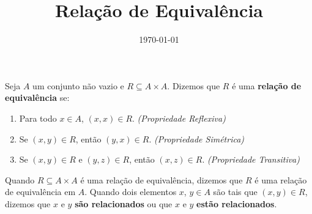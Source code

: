 \documentclass{beamer}
\title{Rela\c{c}\~ao de Equival\^encia}
\author[\autor]{\autor}
\institute[\instituto]{\instituto}
\date{\today}
\begin{document}
    \begin{frame}
        \maketitle
    \end{frame}


    \begin{frame}
        \begin{definicao}
            Seja $A$ um conjunto n{\~a}o vazio e $R\subseteq A \times A$. Dizemos que $R$ {\'e} uma \textbf{rela{\c c}{\~a}o de equival{\^e}ncia} se:
            \begin{enumerate}[label={\roman*})]
                \item Para todo $x \in A$, $(x,x) \in R$. \textit{(Propriedade Reflexiva)}
                \item Se $(x, y) \in R$, ent\~ao $(y, x) \in R$. \textit{(Propriedade Sim\'etrica)}
                \item Se $(x, y) \in R$ e $(y, z) \in R$, ent\~ao $(x, z)\in R$. \textit{(Propriedade Transitiva)}
            \end{enumerate}
        \end{definicao}

        Quando $R\subseteq A \times A$ {\'e} uma rela{\c c}{\~a}o de equival{\^e}ncia, dizemos que $R$ {\'e} uma rela{\c c}{\~a}o de equival{\^e}ncia em $A$. Quando dois elementos $x$, $y \in A$ s{\~a}o tais que $(x,y) \in R$, dizemos que $x$ e $y$ \textbf{s{\~a}o relacionados} ou que $x$ e $y$ \textbf{est\~ao relacionados}.
    \end{frame}
\end{document}

